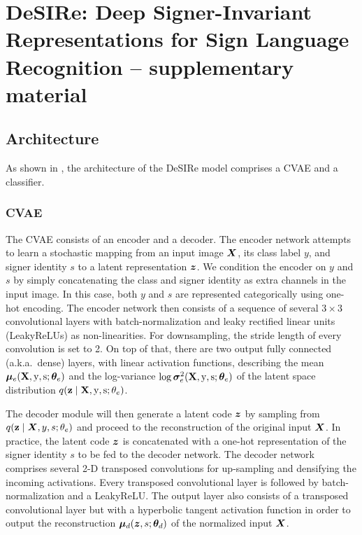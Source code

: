 
\chapter{DeSIRe: Deep Signer-Invariant Representations for Sign Language Recognition -- supplementary material} %

\label{appendix:desire} %

\section{Architecture}
\label{sec:desire_arch}
As shown in , the architecture of the DeSIRe model comprises a CVAE and a classifier.



\subsection{CVAE}
The CVAE consists of an encoder and a decoder. The encoder network attempts to learn a stochastic mapping from an input image ${\bm{X}}$, its class label $y$, and signer identity $s$ to a latent representation ${\bm{z}}$. We condition the encoder on $y$ and $s$ by simply concatenating the class and signer identity as extra channels in the input image. In this case, both $y$ and $s$ are represented categorically using one-hot encoding. The encoder network then consists of a sequence of several $3\times 3$ convolutional layers with batch-normalization and leaky rectified linear units (LeakyReLUs) as non-linearities. For downsampling, the stride length of every convolution is set to 2. On top of that, there are two output fully connected (a.k.a.\ dense) layers, with linear activation functions, describing the mean ${\bm{\mu}}_e({\mathbf{X}},{\textnormal{y}},{\textnormal{s}}; {\bm{\theta}}_e)$ and the log-variance $\log {\bm{\sigma}}_e^2({\mathbf{X}},{\textnormal{y}},{\textnormal{s}}; {\bm{\theta}}_e)$ of the latent space distribution $q({\mathbf{z}} \mid {\mathbf{X}}, {\textnormal{y}}, {\textnormal{s}}; \theta_e)$.

The decoder module will then generate a latent code ${\bm{z}}$ by sampling from $q({\mathbf{z}} \mid {\bm{X}}, y, s; \theta_e)$ and proceed to the reconstruction of the original input ${\bm{X}}$. In practice, the latent code ${\bm{z}}$ is concatenated with a one-hot representation of the signer identity $s$ to be fed to the decoder network. The decoder network comprises several 2-D transposed convolutions for up-sampling and densifying the incoming activations. Every transposed convolutional layer is followed by batch-normalization and a LeakyReLU. The output layer also consists of a transposed convolutional layer but with a hyperbolic tangent activation function in order to output the reconstruction ${\bm{\mu}}_d({\bm{z}},s; {\bm{\theta}}_d)$ of the normalized input ${\bm{X}}$.

